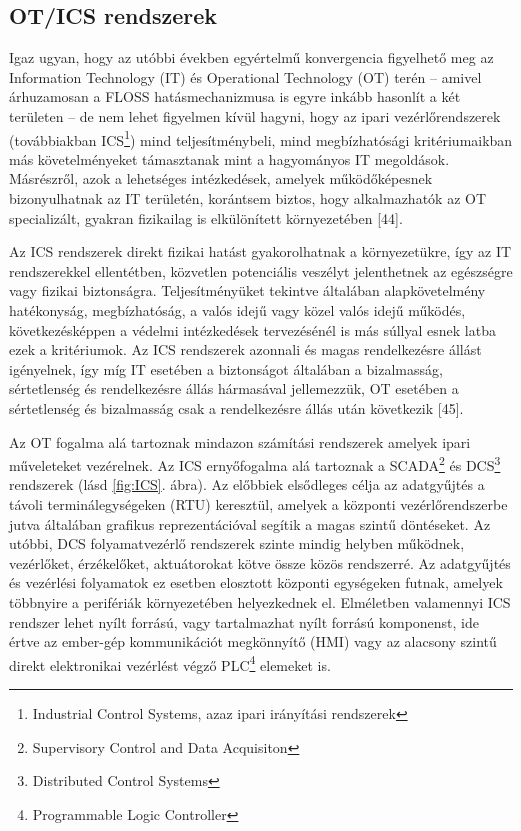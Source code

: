\documentclass[12pt,magyar,a4paper,oneside]{scrreprt}
\begin{document}
\hypertarget{sec:ICS}{%
\subsection{OT/ICS rendszerek}\label{sec:ICS}}

Igaz ugyan, hogy az utóbbi években egyértelmű konvergencia figyelhető
meg az Information Technology (IT) és Operational Technology (OT) terén
-- amivel árhuzamosan a FLOSS hatásmechanizmusa is egyre inkább hasonlít
a két területen -- de nem lehet figyelmen kívül hagyni, hogy az ipari
vezérlőrendszerek (továbbiakban ICS\footnote{Industrial Control Systems,
  azaz ipari irányítási rendszerek}) mind teljesítménybeli, mind
megbízhatósági kritériumaikban más követelményeket támasztanak mint a
hagyományos IT megoldások. Másrészről, azok a lehetséges intézkedések,
amelyek működőképesnek bizonyulhatnak az IT területén, korántsem biztos,
hogy alkalmazhatók az OT specializált, gyakran fizikailag is
elkülönített környezetében {[}44{]}.

Az ICS rendszerek direkt fizikai hatást gyakorolhatnak a környezetükre,
így az IT rendszerekkel ellentétben, közvetlen potenciális veszélyt
jelenthetnek az egészségre vagy fizikai biztonságra. Teljesítményüket
tekintve általában alapkövetelmény hatékonyság, megbízhatóság, a valós
idejű vagy közel valós idejű működés, következésképpen a védelmi
intézkedések tervezésénél is más súllyal esnek latba ezek a kritériumok.
Az ICS rendszerek azonnali és magas rendelkezésre állást igényelnek, így
míg IT esetében a biztonságot általában a bizalmasság, sértetlenség és
rendelkezésre állás hármasával jellemezzük, OT esetében a sértetlenség
és bizalmasság csak a rendelkezésre állás után következik {[}45{]}.

Az OT fogalma alá tartoznak mindazon számítási rendszerek amelyek ipari
műveleteket vezérelnek. Az ICS ernyőfogalma alá tartoznak a
SCADA\footnote{Supervisory Control and Data Acquisiton} és
DCS\footnote{Distributed Control Systems} rendszerek (lásd
\ref{fig:ICS}. ábra). Az előbbiek elsődleges célja az adatgyűjtés a
távoli terminálegységeken (RTU) keresztül, amelyek a központi
vezérlőrendszerbe jutva általában grafikus reprezentációval segítik a
magas szintű döntéseket. Az utóbbi, DCS folyamatvezérlő rendszerek
szinte mindig helyben működnek, vezérlőket, érzékelőket, aktuátorokat
kötve össze közös rendszerré. Az adatgyűjtés és vezérlési folyamatok ez
esetben elosztott központi egységeken futnak, amelyek többnyire a
perifériák környezetében helyezkednek el. Elméletben valamennyi ICS
rendszer lehet nyílt forrású, vagy tartalmazhat nyílt forrású
komponenst, ide értve az ember-gép kommunikációt megkönnyítő (HMI) vagy
az alacsony szintű direkt elektronikai vezérlést végző PLC\footnote{Programmable
  Logic Controller} elemeket is.
\end{document}
